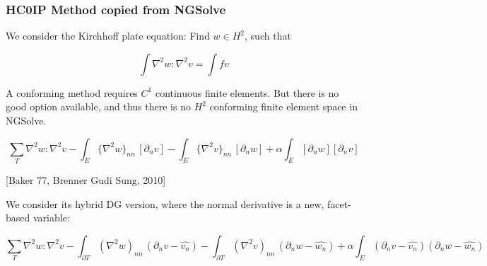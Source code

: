 \subsubsection{HC0IP Method copied from NGSolve}%
\label{ssub:hc0ip_method_from_ngsolve}

We consider the Kirchhoff plate equation: Find $w \in H^2$, such that

$$
\int \nabla^2 w : \nabla^2 v = \int f v
$$

A conforming method requires $C^1$ continuous finite elements. But there is no good option available, and thus there is no $H^2$ conforming finite element space in NGSolve.

$$
\sum_T \nabla^2 w : \nabla^2 v
- \int_{E} \{\nabla^2 w\}_{nn} \, [\partial_n v]
- \int_{E} \{\nabla^2 v\}_{nn} \, [\partial_n w] + \alpha \int_E  [\partial_n w]  [\partial_n v]
$$

[Baker 77, Brenner Gudi Sung, 2010]

We consider its hybrid DG version, where the normal derivative is a new, facet-based variable:


$$
\sum_T \nabla^2 w : \nabla^2 v
- \int_{\partial T} (\nabla^2 w)_{nn} \, (\partial_n v - \widehat{v_n})
- \int_{\partial T} (\nabla^2 v)_{nn} \, (\partial_n w - \widehat{w_n}) + \alpha \int_E (\partial_n v - \widehat{v_n}) (\partial_n w - \widehat{w_n})
$$




